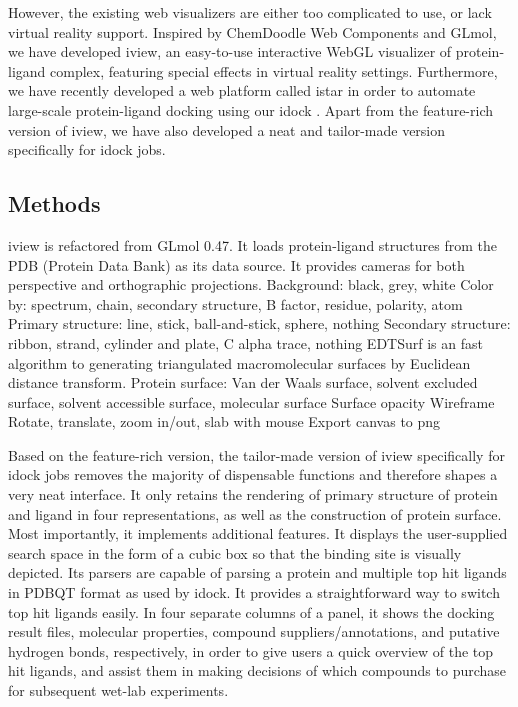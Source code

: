 \documentclass{bioinfo}
\begin{document}
However, the existing web visualizers are either too complicated to use, or lack virtual reality support. Inspired by ChemDoodle Web Components and GLmol, we have developed iview, an easy-to-use interactive WebGL visualizer of protein-ligand complex, featuring special effects in virtual reality settings. Furthermore, we have recently developed a web platform called istar in order to automate large-scale protein-ligand docking using our idock \citep{1153}. Apart from the feature-rich version of iview, we have also developed a neat and tailor-made version specifically for idock jobs.


\begin{methods}
\section{Methods}

iview is refactored from GLmol 0.47. It loads protein-ligand structures from the PDB (Protein Data Bank) \citep{539,537} as its data source. It provides cameras for both perspective and orthographic projections.
Background: black, grey, white
Color by: spectrum, chain, secondary structure, B factor, residue, polarity, atom
Primary structure: line, stick, ball-and-stick, sphere, nothing
Secondary structure: ribbon, strand, cylinder and plate, C alpha trace, nothing
EDTSurf \citep{1297} is an fast algorithm to generating triangulated macromolecular surfaces by Euclidean distance transform.
Protein surface: Van der Waals surface, solvent excluded surface, solvent accessible surface, molecular surface 
Surface opacity
Wireframe
Rotate, translate, zoom in/out, slab with mouse
Export canvas to png

Based on the feature-rich version, the tailor-made version of iview specifically for idock jobs removes the majority of dispensable functions and therefore shapes a very neat interface. It only retains the rendering of primary structure of protein and ligand in four representations, as well as the construction of protein surface. Most importantly, it implements additional features. It displays the user-supplied search space in the form of a cubic box so that the binding site is visually depicted. Its parsers are capable of parsing a protein and multiple top hit ligands in PDBQT format as used by idock. It provides a straightforward way to switch top hit ligands easily. In four separate columns of a panel, it shows the docking result files, molecular properties, compound suppliers/annotations, and putative hydrogen bonds, respectively, in order to give users a quick overview of the top hit ligands, and assist them in making decisions of which compounds to purchase for subsequent wet-lab experiments.

\end{methods}
\end{document}
